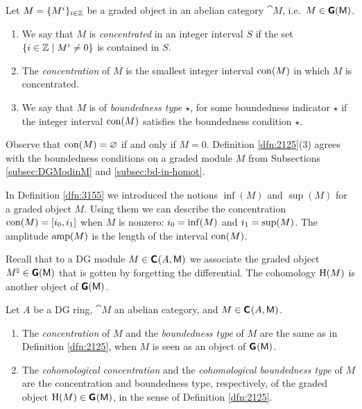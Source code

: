 \begin{dfn}  \label{dfn:2125}
Let $M = \{ M^i \}_{i \in \mathbb{Z}}$ be a graded object in an abelian category 
$\cat{M}$, i.e.\ $M \in \boldsymbol{\mathsf{G}}(\operatorname{\mathsf{M}})$. 
\begin{enumerate}
\item We say that $M$ is {\em concentrated} in an integer interval 
$S$ if the set \lb $\{ i \in \mathbb{Z} \mid M^i \neq 0 \}$ is contained in $S$.

\item The {\em concentration}%
of $M$ is the smallest integer interval 
$\operatorname{con}(M)$ in which $M$ is concentrated.

\item We say that $M$ is of {\em boundedness type $\star$},
for some boundedness indicator $\star$
if the integer interval $\operatorname{con}(M)$ satisfies the boundedness condition 
$\star$.
\end{enumerate}
\end{dfn}

Observe that  $\operatorname{con}(M) = \varnothing$ if and only if $M = 0$. 
Definition \ref{dfn:2125}(3) agrees with the boundedness 
conditions on a graded module $M$ from Subsections 
\ref{subsec:DGModinM} and  \ref{subsec:bd-in-homot}.

In Definition \ref{dfn:3155} we introduced the notions $\inf(M)$ and $\sup(M)$ 
for a graded object $M$. Using them we can describe the 
concentration $\operatorname{con}(M) = [i_0, i_1]$ when $M$ is nonzero:
$i_0 = \operatorname{inf} (M)$ and $i_1 = \operatorname{sup} (M)$.
The amplitude $\operatorname{amp}(M)$ is the length of the interval $\operatorname{con}(M)$.

Recall that to a DG module $M \in \boldsymbol{\mathsf{C}}^{}(A, \operatorname{\mathsf{M}})$ we associate
the graded object $M^{\natural} \in \boldsymbol{\mathsf{G}}(\operatorname{\mathsf{M}})$ that 
is gotten by forgetting the differential. The cohomology $\operatorname{H}(M)$
is another  object of $\boldsymbol{\mathsf{G}}(\operatorname{\mathsf{M}})$. 

\begin{dfn} \label{dfn:4785}
Let  $A$ be a DG ring, $\cat{M}$ an abelian category, and 
$M \in \boldsymbol{\mathsf{C}}^{}(A, \operatorname{\mathsf{M}})$.
\begin{enumerate}
\item The {\em concentration} of $M$%
and the {\em boundedness type}%
of $M$ are the same as in Definition \ref{dfn:2125}, when $M$ is seen as an 
object of $\boldsymbol{\mathsf{G}}^{}(\operatorname{\mathsf{M}})$.

\item The {\em cohomological concentration}%
and the {\em cohomological boundedness type} of $M$%
are the concentration and boundedness type, respectively, of the 
graded object $\operatorname{H}(M) \in \boldsymbol{\mathsf{G}}^{}(\operatorname{\mathsf{M}})$,
in the sense of Definition \ref{dfn:2125}.
\end{enumerate}
\end{dfn}

